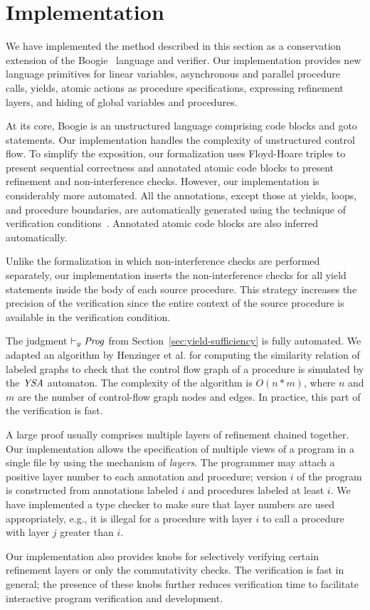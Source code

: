 \section{Implementation}
\label{sec:implementation}

We have implemented the method described in this section as a conservation extension 
of the Boogie~\cite{BarnettCDJL05} language and verifier.
Our implementation provides new language primitives for linear variables, asynchronous and parallel procedure calls, 
yields, atomic actions as procedure specifications, expressing refinement layers, and hiding of global variables and procedures.

At its core, Boogie is an unstructured language comprising code blocks and goto statements.
Our implementation handles the complexity of unstructured control flow.
To simplify the exposition, our formalization uses Floyd-Hoare triples to present sequential correctness and 
annotated atomic code blocks to present refinement and non-interference checks.
However, our implementation is considerably more automated.  
All the annotations, except those at yields, loops, and procedure boundaries, are automatically generated 
using the technique of verification conditions~\cite{BL05}.
Annotated atomic code blocks are also inferred automatically.

Unlike the formalization in which non-interference checks are performed separately,
our implementation inserts the non-interference checks for all yield statements inside the body 
of each source procedure.
This strategy increases the precision of the verification since
the entire context of the source procedure is available in the verification condition.

The judgment $\vdash_y \mathit{Prog}$ from Section~\ref{sec:yield-sufficiency} is fully automated.
We adapted an algorithm by Henzinger et al.\cite{HenzingerHK95} for computing the similarity relation of 
labeled graphs to check that the control flow graph of a procedure is simulated by
the $\mathit{YSA}$ automaton.
The complexity of the algorithm is $O(n*m)$, where $n$ and $m$ are the number of control-flow graph nodes and edges.
In practice, this part of the verification is fast.

A large proof usually comprises multiple layers of refinement chained together.
Our implementation allows the specification of multiple views of a program in a single file by using the mechanism of {\em layers}.
The programmer may attach a positive layer number to each annotation and procedure; 
version $i$ of the program is constructed from annotations labeled $i$ and procedures labeled at least $i$.
We have implemented a type checker to make sure that layer numbers are used appropriately, e.g., 
it is illegal for a procedure with layer $i$ to call a procedure with layer $j$ greater than $i$.

Our implementation also provides knobs for selectively verifying certain refinement layers or only the commutativity checks.
The verification is fast in general; the presence of these knobs further reduces verification time to facilitate 
interactive program verification and development.
